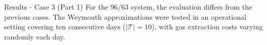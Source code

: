 \documentclass[hyperref={colorlinks,citecolor=blue,linkcolor=blue,urlcolor=blue}]{beamer}
\newlength\figureheight
\newlength\figurewidth
\begin{document}
%                 
%             
%     
%         
%



\begin{frame}{Results - Case 3 (Part 1)}
\footnotesize
    \justifying
    For the 96/63 system, the evaluation differs from the previous cases. 
    The Weymouth approximations 
    were tested in an operational setting covering ten consecutive days 
    ($|\mathcal{T}|=10$), with gas extraction costs varying randomly each day.
     \vspace{0.9em}   
    \begin{figure}[!htb]
        \centering
        \setlength{}        
        \setlength{}
        
        \label{fig:red_test_cost}
    \end{figure}
\end{frame}
\end{document}
